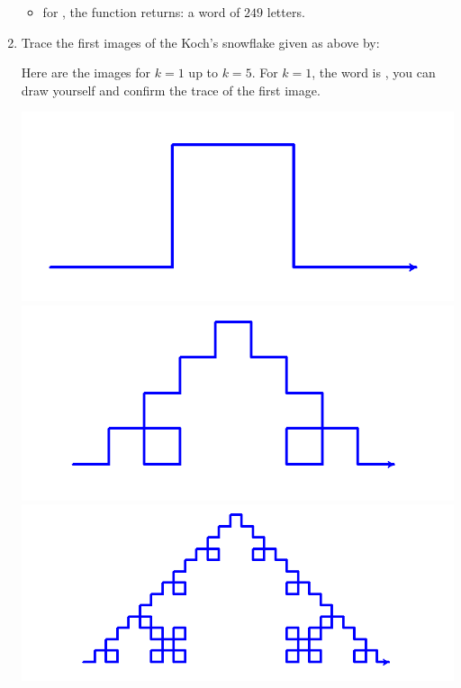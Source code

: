 \documentclass[11pt,class=report,crop=false]{standalone}
\begin{document}
\begin{activite}
\begin{enumerate}
\begin{itemize}
    \item for , the function returns:  a word of $249$ letters.
    
  \end{itemize}
  
  \item Trace the first images of the Koch's snowflake given as above by:  
  
  
  Here are the images for $k=1$ up to $k=5$.
  For $k=1$, the word is , you can draw yourself and confirm the trace of the first image.
  
\begin{center}
\includegraphics[scale=\myscale,scale=0.22]{screen-lsystems-3a}
\includegraphics[scale=\myscale,scale=0.22]{screen-lsystems-3b}
\includegraphics[scale=\myscale,scale=0.22]{screen-lsystems-3c}

\end{center}
\end{enumerate}
\end{activite}
\end{document}
